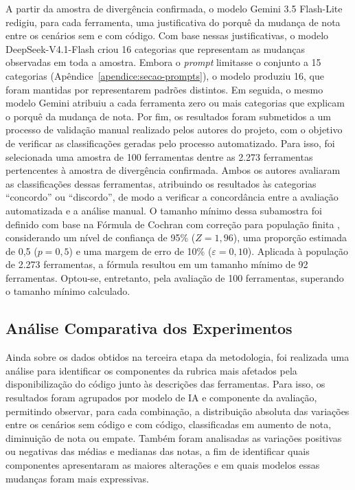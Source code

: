 A partir da amostra de divergência confirmada, o modelo Gemini 3.5 Flash-Lite redigiu, para cada ferramenta, uma justificativa do porquê da mudança de nota entre os cenários sem e com código. Com base nessas justificativas, o modelo DeepSeek-V4.1-Flash criou 16 categorias que representam as mudanças observadas em toda a amostra. Embora o \textit{prompt} limitasse o conjunto a 15 categorias (Apêndice~\ref{apendice:secao-prompts}), o modelo produziu 16, que foram mantidas por representarem padrões distintos. Em seguida, o mesmo modelo Gemini atribuiu a cada ferramenta zero ou mais categorias que explicam o porquê da mudança de nota. Por fim, os resultados foram submetidos a um processo de validação manual realizado pelos autores do projeto, com o objetivo de verificar as classificações geradas pelo processo automatizado. Para isso, foi selecionada uma amostra de 100 ferramentas dentre as 2.273 ferramentas pertencentes à amostra de divergência confirmada. Ambos os autores avaliaram as classificações dessas ferramentas, atribuindo os resultados às categorias ``concordo'' ou ``discordo'', de modo a verificar a concordância entre a avaliação automatizada e a análise manual. O tamanho mínimo dessa subamostra foi definido com base na Fórmula de Cochran com correção para população finita \cite{chaokromthong2021sample}, considerando um nível de confiança de 95\% ($Z = 1{,}96$), uma proporção estimada de 0,5 ($p = 0{,}5$) e uma margem de erro de 10\% ($\varepsilon = 0{,}10$). Aplicada à população de 2.273 ferramentas, a fórmula resultou em um tamanho mínimo de 92 ferramentas. Optou-se, entretanto, pela avaliação de 100 ferramentas, superando o tamanho mínimo calculado.

\subsection{Análise Comparativa dos Experimentos}
\label{subsec:analise-comparativa}

Ainda sobre os dados obtidos na terceira etapa da metodologia, foi realizada uma análise para identificar os componentes da rubrica mais afetados pela disponibilização do código junto às descrições das ferramentas. Para isso, os resultados foram agrupados por modelo de IA e componente da avaliação, permitindo observar, para cada combinação, a distribuição absoluta das variações entre os cenários sem código e com código, classificadas em aumento de nota, diminuição de nota ou empate. Também foram analisadas as variações positivas ou negativas das médias e medianas das notas, a fim de identificar quais componentes apresentaram as maiores alterações e em quais modelos essas mudanças foram mais expressivas.

